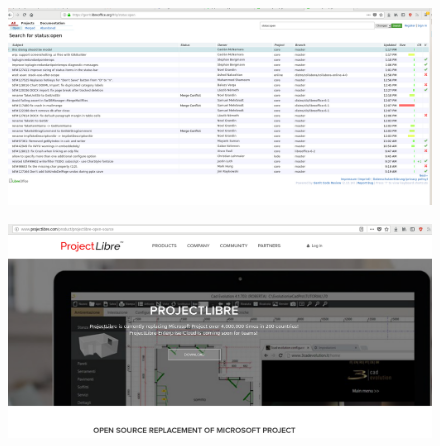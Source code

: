 \documentclass{fancyslides}
\begin{document}
\begin{frame}
\begin{figure}
	\centering
	\includegraphics[width=1\linewidth]{images/libreoffice2}
	\label{fig:libreoffice2}
\end{figure}
\end{frame}

\begin{frame}
	\begin{figure}
		\centering
		\includegraphics[width=1\linewidth]{images/projectlibre}
		\label{fig:projectlibre}
	\end{figure}
	
\end{frame}
\end{document}
